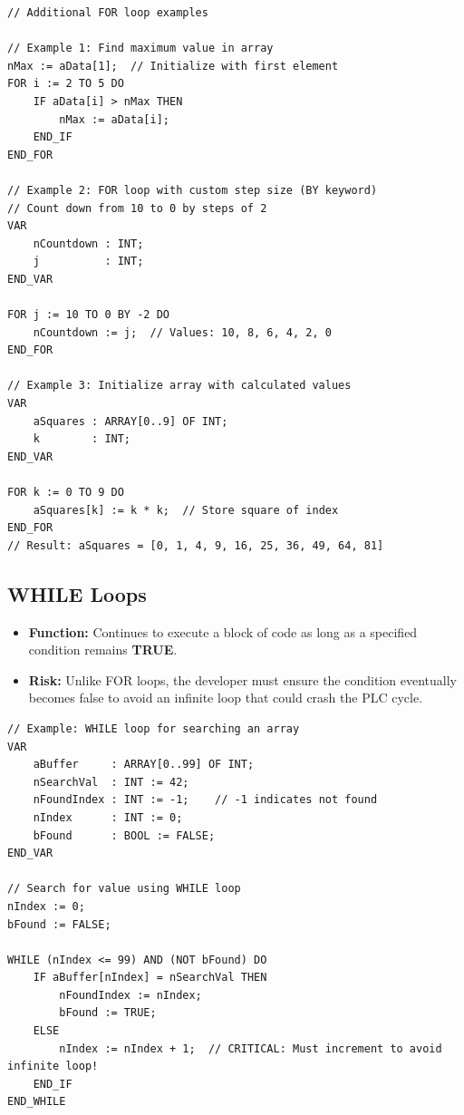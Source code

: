 \documentclass[11pt,a4paper]{article}
\begin{document}
\begin{lstlisting}
// Additional FOR loop examples

// Example 1: Find maximum value in array
nMax := aData[1];  // Initialize with first element
FOR i := 2 TO 5 DO
    IF aData[i] > nMax THEN
        nMax := aData[i];
    END_IF
END_FOR

// Example 2: FOR loop with custom step size (BY keyword)
// Count down from 10 to 0 by steps of 2
VAR
    nCountdown : INT;
    j          : INT;
END_VAR

FOR j := 10 TO 0 BY -2 DO
    nCountdown := j;  // Values: 10, 8, 6, 4, 2, 0
END_FOR

// Example 3: Initialize array with calculated values
VAR
    aSquares : ARRAY[0..9] OF INT;
    k        : INT;
END_VAR

FOR k := 0 TO 9 DO
    aSquares[k] := k * k;  // Store square of index
END_FOR
// Result: aSquares = [0, 1, 4, 9, 16, 25, 36, 49, 64, 81]
\end{lstlisting}

\subsection{WHILE Loops}

\begin{itemize}[leftmargin=*]
    \item \textbf{Function:} Continues to execute a block of code as long as a specified condition remains \textbf{TRUE}.
    
    \item \textbf{Risk:} Unlike FOR loops, the developer must ensure the condition eventually becomes false to avoid an infinite loop that could crash the PLC cycle.
\end{itemize}

\begin{lstlisting}
// Example: WHILE loop for searching an array
VAR
    aBuffer     : ARRAY[0..99] OF INT;
    nSearchVal  : INT := 42;
    nFoundIndex : INT := -1;    // -1 indicates not found
    nIndex      : INT := 0;
    bFound      : BOOL := FALSE;
END_VAR

// Search for value using WHILE loop
nIndex := 0;
bFound := FALSE;

WHILE (nIndex <= 99) AND (NOT bFound) DO
    IF aBuffer[nIndex] = nSearchVal THEN
        nFoundIndex := nIndex;
        bFound := TRUE;
    ELSE
        nIndex := nIndex + 1;  // CRITICAL: Must increment to avoid infinite loop!
    END_IF
END_WHILE
\end{lstlisting}
\end{document}
